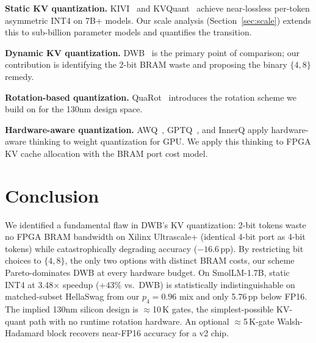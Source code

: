 \documentclass{article}
\begin{document}
\textbf{Static KV quantization.} KIVI~\citep{liu2024kivi} and KVQuant~\citep{hooper2024kvquant} achieve near-lossless per-token asymmetric INT4 on 7B+ models. Our scale analysis (Section~\ref{sec:scale}) extends this to sub-billion parameter models and quantifies the transition.

\textbf{Dynamic KV quantization.} DWB~\citep{haeri2026dwb} is the primary point of comparison; our contribution is identifying the 2-bit BRAM waste and proposing the binary $\{4,8\}$ remedy.

\textbf{Rotation-based quantization.} QuaRot~\citep{ashkboos2024quarot} introduces the rotation scheme we build on for the 130nm design space.

\textbf{Hardware-aware quantization.} AWQ~\citep{lin2023awq}, GPTQ~\citep{frantar2022gptq}, and InnerQ apply hardware-aware thinking to weight quantization for GPU. We apply this thinking to FPGA KV cache allocation with the BRAM port cost model.

\section{Conclusion}

We identified a fundamental flaw in DWB's KV quantization: 2-bit tokens waste no FPGA BRAM bandwidth on Xilinx Ultrascale+ (identical 4-bit port as 4-bit tokens) while catastrophically degrading accuracy ($-16.6$\,pp). By restricting bit choices to $\{4,8\}$, the only two options with distinct BRAM costs, our scheme Pareto-dominates DWB at every hardware budget. On SmolLM-1.7B, static INT4 at 3.48$\times$ speedup ($+43\%$ vs.\ DWB) is statistically indistinguishable on matched-subset HellaSwag from our $p_4=0.96$ mix and only 5.76\,pp below FP16. The implied 130nm silicon design is $\approx$10\,K gates, the simplest-possible KV-quant path with no runtime rotation hardware. An optional $\approx$5\,K-gate Walsh-Hadamard block recovers near-FP16 accuracy for a v2 chip.



\end{document}

